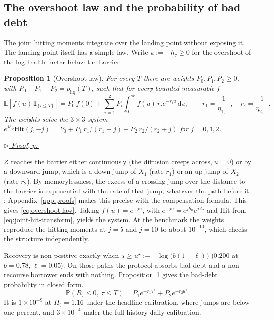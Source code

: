\documentclass[11pt]{article}
\newcommand{\proofref}[1]{%
  \par\noindent\hfill{\small\itshape\hyperref[#1]{$\triangleright$ Proof, p.\,\pageref{#1}}}}
\newcommand{\E}{\mathbb{E}}
\renewcommand{\P}{\mathbb{P}}
\newcommand{\diff}{\mathrm{d}}
\newcommand{\one}{\mathbf{1}}
\theoremstyle{plain}
\newtheorem{proposition}[theorem]{Proposition}
\theoremstyle{definition}
\theoremstyle{remark}
\begin{document}
\subsection{The overshoot law and the probability of bad debt}\label{sec:overshoot-law}
The joint hitting moments integrate over the landing point without exposing it. The landing point
itself has a simple law. Write $u:=-h_\tau\ge0$ for the overshoot of the log health factor below the
barrier.

\begin{proposition}[Overshoot law]\label{prop:overshoot-law}
For every $T$ there are weights $P_0,P_1,P_2\ge0$, with $P_0+P_1+P_2=p_{\mathrm{liq}}(T)$, such that
for every bounded measurable $f$
\begin{equation}\label{eq:overshoot-law}
\E\!\left[f(u)\,\one_{\{\tau\le T\}}\right]
= P_0\,f(0)+\sum_{i=1}^{2}P_i\int_0^\infty f(u)\,r_ie^{-r_iu}\,\diff u,
\qquad r_1=\frac1{\eta_{1,-}},\quad r_2=\frac1{\eta_{2,+}}.
\end{equation}
The weights solve the $3\times3$ system
$e^{jh_0}\mathrm{Hit}(j,-j)=P_0+P_1\,r_1/(r_1+j)+P_2\,r_2/(r_2+j)$ for $j=0,1,2$.
\end{proposition}
\proofref{proof:prop:overshoot-law}

\noindent
$Z$ reaches the barrier either continuously (the diffusion creeps across, $u=0$) or by a downward
jump, which is a down-jump of $X_1$ (rate $r_1$) or an up-jump of $X_2$ (rate $r_2$). By
memorylessness, the excess of a crossing jump over the distance to the barrier is exponential with
the rate of that jump, whatever the path before it \citep{Kou2002,KouWang2003}; Appendix~\ref{app:proofs}
makes this precise with the compensation formula. This gives \eqref{eq:overshoot-law}. Taking $f(u)=e^{-ju}$, with
$e^{-ju}=e^{jh_0}e^{jZ_\tau}$ and $\mathrm{Hit}$ from \eqref{eq:joint-hit-transform}, yields the
system. At the benchmark the weights reproduce the hitting moments at $j=5$ and $j=10$ to about
$10^{-10}$, which checks the structure independently.

Recovery is non-positive exactly when $u\ge u^\star:=-\log\bigl(b(1+\ell)\bigr)$ ($0.200$ at
$b=0.78$, $\ell=0.05$). On those paths the protocol absorbs bad debt and a non-recourse borrower ends
with nothing. Proposition~\ref{prop:overshoot-law} gives the bad-debt probability in closed form,
\begin{equation}\label{eq:bad-debt}
\P\!\left(R_\tau\le0,\ \tau\le T\right)=P_1e^{-r_1u^\star}+P_2e^{-r_2u^\star}.
\end{equation}
It is $1\times10^{-9}$ at $H_0=1.16$ under the headline calibration, where jumps are below one
percent, and $3\times10^{-4}$ under the full-history daily calibration.
\end{document}

